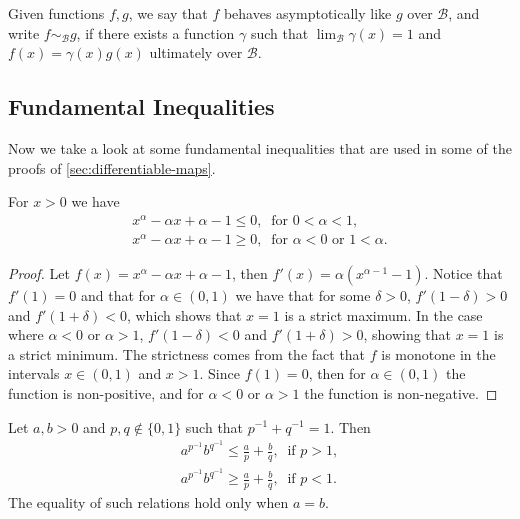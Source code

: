 \begin{definition}
    Given functions \(f, g\), we say that \(f\) behaves asymptotically like \(g\)
    over \(\mathcal B\), and write \(f \sim_{\mathcal B} g\), if there exists a
    function \(\gamma\) such that \(\lim_{\mathcal B} \gamma(x) = 1\) and \(f(x) =
    \gamma(x) g(x)\) ultimately over \(\mathcal B\).
\end{definition}

\subsection{Fundamental Inequalities}

Now we take a look at some fundamental inequalities that are used in some of the
proofs of \cref{sec:differentiable-maps}.

\begin{lemma}\label{lem: CI}
    For \(x > 0\) we have
    \begin{gather}
        \label{eq: CI-1}
        x^\alpha - \alpha x + \alpha - 1 \leq 0,\ \text{ for } 0 < \alpha < 1, \\
        \label{eq: CI-2}
        x^\alpha - \alpha x + \alpha - 1 \geq 0,\ \text{ for } \alpha < 0 \text{ or
        } 1 < \alpha.
    \end{gather}
\end{lemma}

\begin{proof}
    Let \(f(x) = x^\alpha - \alpha x + \alpha - 1\), then \(f'(x) =
    \alpha(x^{\alpha - 1} - 1)\). Notice that \(f'(1) = 0\) and that for \(\alpha
    \in (0, 1)\) we have that for some \(\delta > 0\), \(f'(1 - \delta) > 0\) and
    \(f'(1 + \delta) < 0\), which shows that \(x = 1\) is a strict maximum. In the
    case where \(\alpha < 0\) or \(\alpha > 1\), \(f'(1 - \delta) < 0\) and \(f'(1
    + \delta) > 0\), showing that \(x = 1\) is a strict minimum. The strictness
    comes from the fact that \(f\) is monotone in the intervals \(x \in (0, 1)\)
    and \(x > 1\). Since \(f(1) = 0\), then for \(\alpha \in (0, 1)\) the function
    is non-positive, and for \(\alpha < 0\) or \(\alpha > 1\) the function is
    non-negative.
\end{proof}

\begin{proposition}\label{prop: young-ineq}
    Let \(a, b >0\) and \(p, q \not\in \{0, 1\}\) such that \(p^{-1} + q^{-1} =
    1\). Then
    \begin{gather}
        \label{eq: young-1}
        a^{p^{-1}} b^{q^{-1}} \leq \frac a p  + \frac b q,\ \text{ if } p > 1,
        \\
        \label{eq: young-2}
        a^{p^{-1}} b^{q^{-1}} \geq \frac a p  + \frac b q,\ \text{ if } p < 1.
    \end{gather}
    The equality of such relations hold only when \(a = b\).
\end{proposition}

